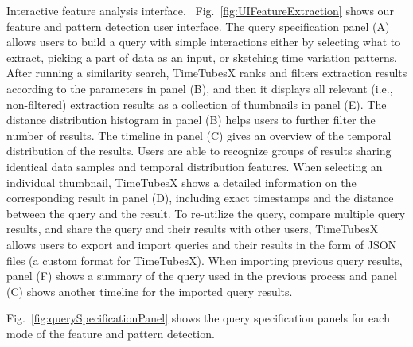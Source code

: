 \textsf{Interactive feature analysis interface.\ } 
Fig.~\ref{fig:UIFeatureExtraction} shows our feature and pattern detection user interface. 
The query specification panel (A) allows users %
to build a query with simple interactions either by selecting what to extract, picking a part of data as an input, or sketching time variation patterns.
After running a similarity search, 
TimeTubesX ranks and filters extraction results according to the parameters in panel (B),
and then it displays all relevant (i.e., non-filtered) extraction results as a collection of thumbnails in panel (E).
The distance distribution histogram in panel (B) helps users to further filter the number of results.
The timeline in panel (C) gives an overview of the temporal distribution of the results.
Users are able to recognize groups of results sharing identical data samples and temporal distribution features.
When selecting an individual thumbnail, TimeTubesX shows a detailed information on the corresponding result in panel (D), including exact timestamps and the distance between the query and the result.
To re-utilize the query, compare multiple query results, and share the query and their results with other users, 
TimeTubesX allows users to export and import queries and their results in the form of JSON files (a custom format for TimeTubesX).
When importing previous query results,
panel (F) shows a summary of the query used in the previous process and panel (C) shows another timeline for the imported query results.

Fig.~\ref{fig:querySpecificationPanel} shows the query specification panels for each mode of the feature and pattern detection.

